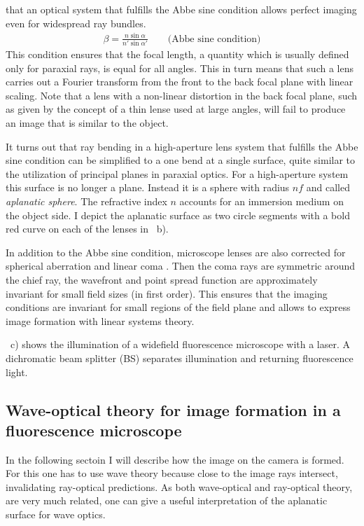 that an optical system that fulfills the Abbe sine condition allows
perfect imaging even for widespread ray bundles.
\begin{align}
  \label{eq:sine-condition}
  \beta = \frac{n \sin\alpha}{n' \sin\alpha'} \qquad \textrm{(Abbe sine condition)}
\end{align}
This condition ensures that the focal length, a quantity which is
usually defined only for paraxial rays, is equal for all angles.  This
in turn means that such a lens carries out a Fourier transform from
the front to the back focal plane with linear scaling. Note that a
lens with a non-linear distortion in the back focal plane, such as given by the concept of a thin lense used at large angles, will fail to
produce an image that is similar to the object.

It turns out that ray bending\label{aplanatic} in a high-aperture lens
system that  fulfills the Abbe sine condition
can be simplified to a one bend at a single surface, quite similar to
the utilization of principal planes in paraxial optics. For a
high-aperture system this surface is no longer a plane.  Instead it is
a sphere with radius $n f$ and called \emph{aplanatic sphere}.  The
refractive index $n$ accounts for an immersion medium on the object
side.  I depict the aplanatic surface as two circle segments with a
bold red curve on each of the lenses in
~b).

In addition to the Abbe sine condition, microscope lenses are also
corrected for spherical aberration and linear coma \citep{Gross2005}.
Then the coma rays are symmetric around the chief ray, the wavefront
and point spread function are approximately invariant for small field
sizes (in first order).  This ensures that the imaging conditions are
invariant for small regions of the field plane and allows to express
image formation with linear systems theory.

~c) shows the illumination of a
widefield fluorescence microscope with a laser. A dichromatic beam
splitter (BS) separates illumination and returning fluorescence light.

\subsection{Wave-optical theory for image formation in a fluorescence microscope}
In the following sectoin I will describe how the image on the camera
 is formed. For this one has to use wave theory
because close to the image rays intersect, invalidating ray-optical
predictions. As both wave-optical and ray-optical theory, are very
much related, one can give a useful interpretation of the aplanatic
surface for wave optics.

